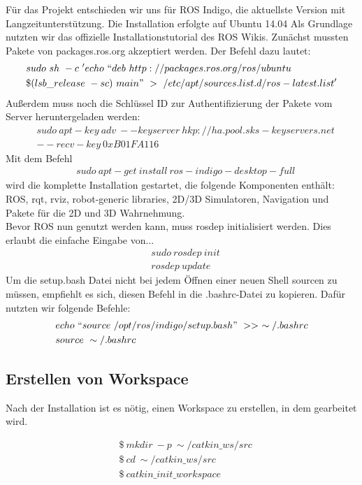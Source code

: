 \documentclass{scrartcl}
\begin{document}
Für das Projekt entschieden wir uns für ROS Indigo, die aktuellste Version mit Langzeitunterstützung.
Die Installation erfolgte auf Ubuntu 14.04 
Als Grundlage nutzten wir das offizielle Installationstutorial des ROS Wikis.
Zunächst mussten Pakete von packages.ros.org akzeptiert werden. Der Befehl dazu lautet: 
\begin{align}
&sudo\ sh\ -c\ 'echo\ ``deb\ http://packages.ros.org/ros/ubuntu \\ 
&\$(lsb\_release\ -sc)\ main"\ >\ /etc/apt/sources.list.d/ros-latest.list'
\end{align}
Außerdem muss noch die Schlüssel ID  zur Authentifizierung der Pakete vom Server heruntergeladen werden:
\begin{align}
&sudo\ apt-key\ adv\ --keyserver\ hkp://ha.pool.sks-keyservers.net\\ 
& --recv-key\ 0xB01FA116
\end{align}
Mit dem Befehl 
\begin{align}
&sudo\ apt-get\ install\ ros-indigo-desktop-full
\end{align}
wird die komplette Installation gestartet, die folgende Komponenten enthält: ROS, rqt, rviz, robot-generic libraries, 2D/3D Simulatoren, Navigation und Pakete für die 2D und 3D Wahrnehmung.
\\
Bevor ROS nun genutzt werden kann, muss rosdep initialisiert werden. Dies erlaubt die einfache Eingabe von...
\begin{align}
&sudo\ rosdep\ init\\
&rosdep\ update
\end{align}
Um die setup.bash Datei nicht bei jedem Öffnen einer neuen Shell sourcen zu müssen, empfiehlt es sich, diesen Befehl in die .bashrc-Datei zu kopieren.
Dafür nutzten wir folgende Befehle:
\begin{align}
&echo\ ``source\ /opt/ros/indigo/setup.bash"\ >>\ \sim/.bashrc\\
&source\ \sim/.bashrc
\end{align}

\subsection{Erstellen von Workspace}

Nach der Installation ist es nötig, einen Workspace zu erstellen, in dem gearbeitet wird.

\begin{align}
&\$\ mkdir\ -p\ \sim/catkin\_ws/src\\
&\$\ cd\ \sim/catkin\_ws/src\\
&\$\ catkin\_init\_workspace
\end{align}
\end{document}
